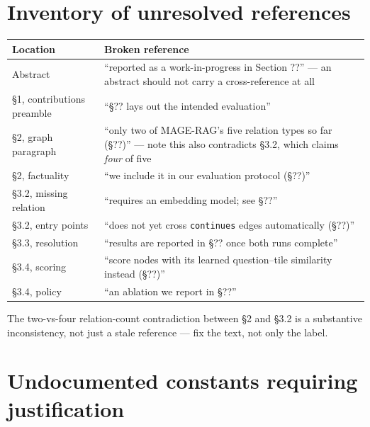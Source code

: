 \documentclass[11pt,a4paper]{article}
\begin{document}
\appendix
\section{Inventory of unresolved references}

\begin{center}
\begin{tabularx}{\textwidth}{@{}lX@{}}
\toprule
\textbf{Location} & \textbf{Broken reference} \\
\midrule
Abstract & ``reported as a work-in-progress in Section ??'' --- an abstract should not carry a cross-reference at all \\
\S1, contributions preamble & ``\S?? lays out the intended evaluation'' \\
\S2, graph paragraph & ``only two of MAGE-RAG's five relation types so far (\S??)'' --- note this also contradicts \S3.2, which claims \emph{four} of five \\
\S2, factuality & ``we include it in our evaluation protocol (\S??)'' \\
\S3.2, missing relation & ``requires an embedding model; see \S??'' \\
\S3.2, entry points & ``does not yet cross \texttt{continues} edges automatically (\S??)'' \\
\S3.3, resolution & ``results are reported in \S?? once both runs complete'' \\
\S3.4, scoring & ``score nodes with its learned question--tile similarity instead (\S??)'' \\
\S3.4, policy & ``an ablation we report in \S??'' \\
\bottomrule
\end{tabularx}
\end{center}

\noindent The two-vs-four relation-count contradiction between \S2 and \S3.2 is a
substantive inconsistency, not just a stale reference --- fix the text, not only the label.

\section{Undocumented constants requiring justification}
\end{document}
